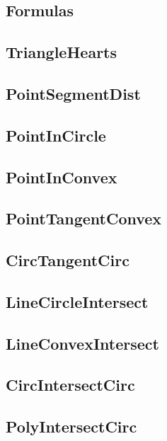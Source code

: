 	\subsection{Formulas}
	
	\subsection{TriangleHearts}
	
	\subsection{PointSegmentDist}
	
	\subsection{PointInCircle}
	
	\subsection{PointInConvex}
	
	\subsection{PointTangentConvex}
	
	\subsection{CircTangentCirc}
	
	\subsection{LineCircleIntersect}
	
	\subsection{LineConvexIntersect}
	
	\subsection{CircIntersectCirc}
	
	\subsection{PolyIntersectCirc}
	
